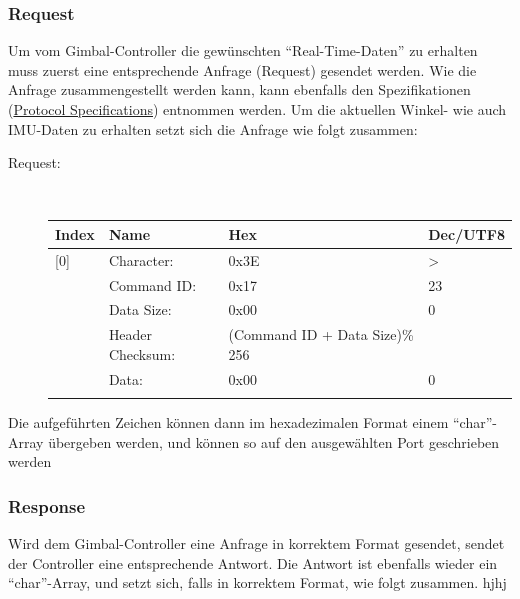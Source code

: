 \documentclass[12pt]{article} %
\begin{document}
	\subsubsection{Request}
	Um vom Gimbal-Controller die gewünschten "`Real-Time-Daten"' zu erhalten muss zuerst eine entsprechende Anfrage (Request) gesendet werden. Wie die Anfrage zusammengestellt werden kann, kann ebenfalls den Spezifikationen (\href{https://github.com/kevinsaner91/Gimbal\_Control/blob/master/doc/SBGC\_doc/SimpleBGC\_2\_6\_Serial\_Protocol\_Specification\%20(1).pdf}{Protocol Specifications}) entnommen werden. Um die aktuellen Winkel- wie auch IMU-Daten zu erhalten setzt sich die Anfrage wie folgt zusammen:

	\begin{description}
	\item[Request:]~\par
	\begin{tabular}{llll}
		\textbf{Index} & \textbf{Name} & \textbf{Hex}& \textbf{Dec/UTF8}\\ \toprule[1.5pt]
		[0] &Character:& 0x3E & >\\ \hline
		[1] &Command ID:& 0x17& 23\\ \hline
		[2] &Data Size:& 0x00& 0\\ \hline
		[3] &Header Checksum: & (Command ID + Data Size)\% 256\\ \hline
		[4] &Data: & 0x00& 0\\ \\
		\end{tabular}
	\end{description}
	
	\noindent
	Die aufgeführten Zeichen können dann im hexadezimalen Format einem "`char"'-Array übergeben werden, und können so auf den ausgewählten Port geschrieben werden
	
	\subsubsection{Response}\label{response}
	Wird dem Gimbal-Controller eine Anfrage in korrektem Format gesendet, sendet der Controller eine entsprechende Antwort. Die Antwort ist ebenfalls wieder ein "`char"'-Array, und setzt sich, falls in korrektem Format, wie folgt zusammen. hjhj
		
\end{document}

